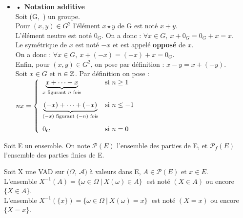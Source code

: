 \begin{itemize}[leftmargin=0cm]
    \item[] \hspace{0.5cm} \textbf{• Notation additive}\vspace{0.3cm}\\
    Soit (G,\ \lci) un groupe.\vspace{0.1cm}\\
    Pour \((x,y)\in G^2\) l'élément \(x\star y\) de G est noté \(x+y\).\\
    L'élément neutre est noté \(0_G\). On a donc : \(\forall x\in G,\ x+0_G=0_G+x=x\).\\
    Le symétrique de \(x\) est noté \(-x\) et est appelé \textbf{opposé} de \(x\).\\
    On a donc : \(\forall x\in G,\ x+(-x)=(-x)+x=0_G.\)\\
    Enfin, pour \((x,y)\in G^2\), on pose par définition : \(x-y=x+(-y).\)\vspace{0.4cm}\\
    Soit \(x\in G\) et \(n\in \mathbb{Z}\).
    Par définition on pose : \( nx= \left\{
    \begin{array}{ll}
        \underset{x \text{ figurant } n \text{ fois} }{\underbrace{x+ \cdots + x}} & \text{si } n\geq 1 \vspace{0.3cm} \\
        \underset{(-x) \text{ figurant } (-n) \text{ fois} }{\underbrace{(-x)+\cdots+(-x)}} & \text{si } n\leq -1\vspace{0.3cm} \\
        0_G & \text{si } n=0
    \end{array}
    \right. \)
\end{itemize}

\vspace{1.7cm}

Soit E un ensemble. On note \(\mathcal{P}(E)\) l'ensemble des parties de E, et \(\mathcal{P}_f(E)\) l'ensemble des parties finies de E.

\vspace{1cm}

Soit X une VAD sur \(\bigl(\Omega,\,\mathcal{A}\bigr)\) à valeurs dans E, \(A\in \mathcal{P}(E)\) et \(x\in E\).\vspace{0.1cm}\\
L'ensemble \(X^{-1}(A)=\{\omega\in \Omega \ \rvert \ X(\omega)\in A\}\;\) est noté \((X\in A)\) ou encore \(\{X\in A\}\).\vspace{0.1cm}\\
L'ensemble \(X^{-1}(\{x\})=\{\omega\in \Omega \ \rvert \ X(\omega)=x\}\;\) est noté \((X=x)\) ou encore \(\{X=x\}\).\vspace{0.1cm}\\

